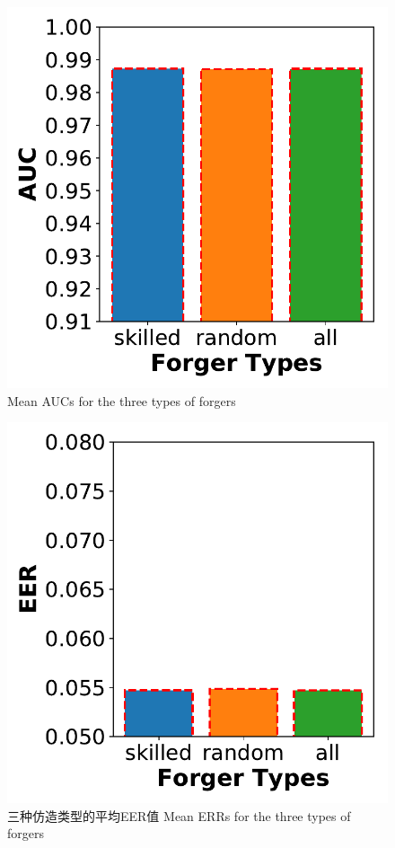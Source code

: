 \begin{figure}
  \centering
  \begin{minipage}[t]{0.49\textwidth}
    \centering
    \includegraphics[width=\textwidth]{figure/auc-bars.pdf}
      {Mean AUCs for the three types of forgers}
        \label{fig:mean-auc-forgers}
  \end{minipage}
  \centering
  \begin{minipage}[t]{0.49\textwidth}
    \centering
    \includegraphics[width=\textwidth]{figure/eer-bars.pdf}
    \bicaption
    {三种仿造类型的平均EER值}
    {Mean ERRs for the three types of forgers}
    \label{fig:mean-eer-forgers}
   \end{minipage}
\end{figure}

